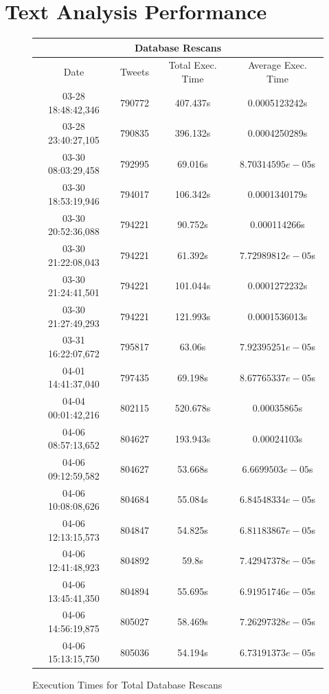 \documentclass[12pt,a4paper]{report}
\begin{document}
  \section{Text Analysis Performance}
  \begin{figure}[h]
    \centering
    \begin{tabular}{|c|c|c|c|}
      \hline
      \multicolumn{4}{|c|}{Database Rescans} \\
      \hline
      Date & Tweets & Total Exec. Time & Average Exec. Time \\ [0.5ex]
      \hline
      03-28 18:48:42,346 & 790772 & 407.437s & 0.0005123242s \\
      \hline
      03-28 23:40:27,105 & 790835 & 396.132s & 0.0004250289s \\
      \hline 
      03-30 08:03:29,458 & 792995 & 69.016s & $8.70314595e-05$s \\
      \hline
      03-30 18:53:19,946 & 794017 & 106.342s & 0.0001340179s \\
      \hline
      03-30 20:52:36,088 & 794221 & 90.752s & 0.000114266s \\
      \hline
      03-30 21:22:08,043 & 794221 & 61.392s & $7.72989812e-05$s \\
      \hline
      03-30 21:24:41,501 & 794221 & 101.044s & 0.0001272232s \\
      \hline
      03-30 21:27:49,293 & 794221 & 121.993s & 0.0001536013s \\
      \hline
      03-31 16:22:07,672 & 795817 & 63.06s & $7.92395251e-05$s \\
      \hline 
      04-01 14:41:37,040 & 797435 & 69.198s & $8.67765337e-05$s \\
      \hline
      04-04 00:01:42,216 & 802115 & 520.678s & 0.00035865s \\
      \hline
      04-06 08:57:13,652 & 804627 & 193.943s & 0.00024103s \\
      \hline
      04-06 09:12:59,582 & 804627 & 53.668s & $6.6699503e-05$s \\
      \hline
      04-06 10:08:08,626 & 804684 & 55.084s & $6.84548334e-05$s \\
      \hline
      04-06 12:13:15,573 & 804847 & 54.825s & $6.81183867e-05$s \\
      \hline
      04-06 12:41:48,923 & 804892 & 59.8s & $7.42947378e-05$s \\
      \hline
      04-06 13:45:41,350 & 804894 & 55.695s & $6.91951746e-05$s \\
      \hline
      04-06 14:56:19,875 & 805027 & 58.469s & $7.26297328e-05$s \\
      \hline
      04-06 15:13:15,750 & 805036 & 54.194s & $6.73191373e-05$s \\
      \hline
    \end{tabular}
    \caption{Execution Times for Total Database Rescans}
    \label{t:2}
  \end{figure}
\end{document}
